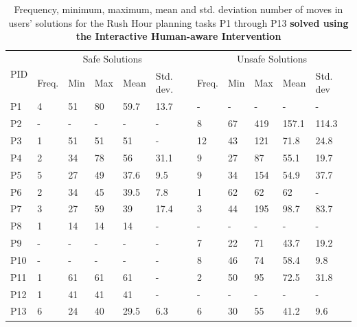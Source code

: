 \begin{table}[tpb]
\caption{Frequency, minimum, maximum, mean and std. deviation number of moves in users' solutions for the Rush Hour planning tasks P1 through P13 \textbf{solved using the Interactive Human-aware Intervention}}
\begin{tabular}{|l|l|l|l|l|l|l|l|l|l|l|}
\hline
\multirow{2}{*}{PID} & \multicolumn{5}{c|}{Safe Solutions}  & \multicolumn{5}{c|}{Unsafe Solutions} \\ \cline{2-11} 
                     & Freq. & Min & Max & Mean & Std. dev. & Freq.  & Min & Max & Mean  & Std. dev \\ \hline
P1                   & 4     & 51  & 80  & 59.7 & 13.7      & -      & -   & -   & -     & -        \\
P2                   & -     & -   & -   & -    & -         & 8      & 67  & 419 & 157.1 & 114.3    \\
P3                   & 1     & 51  & 51  & 51   & -         & 12     & 43  & 121 & 71.8  & 24.8     \\
P4                   & 2     & 34  & 78  & 56   & 31.1      & 9      & 27  & 87  & 55.1  & 19.7     \\
P5                   & 5     & 27  & 49  & 37.6 & 9.5       & 9      & 34  & 154 & 54.9  & 37.7     \\
P6                   & 2     & 34  & 45  & 39.5 & 7.8       & 1      & 62  & 62  & 62    & -        \\
P7                   & 3     & 27  & 59  & 39   & 17.4      & 3      & 44  & 195 & 98.7  & 83.7     \\
P8                   & 1     & 14  & 14  & 14   & -         & -      & -   & -   & -     & -        \\
P9                   & -     & -   & -   & -    & -         & 7      & 22  & 71  & 43.7  & 19.2     \\
P10                  & -     & -   & -   & -    & -         & 8      & 46  & 74  & 58.4  & 9.8      \\
P11                  & 1     & 61  & 61  & 61   & -         & 2      & 50  & 95  & 72.5  & 31.8     \\
P12                  & 1     & 41  & 41  & 41   & -         & -      & -   & -   & -     & -        \\
P13                  & 6     & 24  & 40  & 29.5 & 6.3       & 6      & 30  & 55  & 41.2  & 9.6      \\ \hline
\end{tabular}
\label{tab:usersolutionsphase2}
\end{table}

